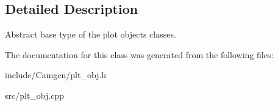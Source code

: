 \subsection{Detailed Description}
Abstract base type of the plot objects classes. 

The documentation for this class was generated from the following files\-:\begin{DoxyCompactItemize}
\item 
include/\-Camgen/plt\-\_\-obj.\-h\item 
src/plt\-\_\-obj.\-cpp\end{DoxyCompactItemize}
